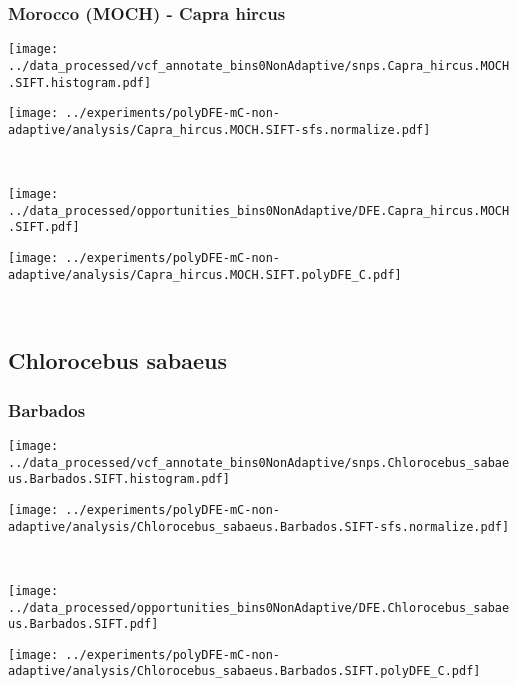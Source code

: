 \subsubsection{Morocco (MOCH) - Capra hircus}

\begin{minipage}{0.49\linewidth}
    \texttt{[image: ../data\_processed/vcf\_annotate\_bins0NonAdaptive/snps.Capra\_hircus.MOCH.SIFT.histogram.pdf]}
\end{minipage}
\begin{minipage}{0.49\linewidth}
    \texttt{[image: ../experiments/polyDFE-mC-non-adaptive/analysis/Capra\_hircus.MOCH.SIFT-sfs.normalize.pdf]}
\end{minipage}
\\
\begin{minipage}{0.49\linewidth}
    \texttt{[image: ../data\_processed/opportunities\_bins0NonAdaptive/DFE.Capra\_hircus.MOCH.SIFT.pdf]}
\end{minipage}
\begin{minipage}{0.49\linewidth}
    \texttt{[image: ../experiments/polyDFE-mC-non-adaptive/analysis/Capra\_hircus.MOCH.SIFT.polyDFE\_C.pdf]}
\end{minipage}
\\

\subsection{Chlorocebus sabaeus}

\subsubsection{Barbados}

\begin{minipage}{0.49\linewidth}
    \texttt{[image: ../data\_processed/vcf\_annotate\_bins0NonAdaptive/snps.Chlorocebus\_sabaeus.Barbados.SIFT.histogram.pdf]}
\end{minipage}
\begin{minipage}{0.49\linewidth}
    \texttt{[image: ../experiments/polyDFE-mC-non-adaptive/analysis/Chlorocebus\_sabaeus.Barbados.SIFT-sfs.normalize.pdf]}
\end{minipage}
\\
\begin{minipage}{0.49\linewidth}
    \texttt{[image: ../data\_processed/opportunities\_bins0NonAdaptive/DFE.Chlorocebus\_sabaeus.Barbados.SIFT.pdf]}
\end{minipage}
\begin{minipage}{0.49\linewidth}
    \texttt{[image: ../experiments/polyDFE-mC-non-adaptive/analysis/Chlorocebus\_sabaeus.Barbados.SIFT.polyDFE\_C.pdf]}
\end{minipage}
\\


